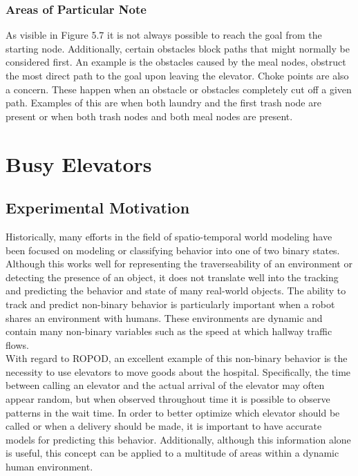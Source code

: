   \subsubsection{ Areas of Particular Note }

  As visible in Figure 5.7 it is not always possible to reach the goal from the
  starting node. Additionally, certain obstacles block paths that might
  normally be considered first. An example is the obstacles caused by
  the meal nodes, obstruct the most direct path to the goal upon leaving
  the elevator. Choke points are also a concern. These happen when an obstacle
  or obstacles completely cut off a given path. Examples of this are when both
  laundry and the first trash node are present or when both trash nodes and both
  meal nodes are present.


  \section{ Busy Elevators }

  \subsection{ Experimental Motivation }

  Historically, many efforts in the field of spatio-temporal world modeling
  have been focused on modeling or classifying behavior into one of two binary
  states. Although this works well for
  representing the traverseability of an environment or detecting the presence of an object,
  it does not translate well into the tracking and predicting the behavior and
  state of many real-world objects. The ability to track and predict
  non-binary behavior is particularly important when a robot shares an
  environment with humans. These environments are dynamic and contain many
  non-binary variables such as the speed at which hallway traffic flows. \\

  With regard to ROPOD, an excellent example of this non-binary
  behavior is the necessity to use elevators to move goods about the hospital.
  Specifically, the time between calling an elevator and the actual arrival of
  the elevator may often appear random, but when observed throughout time
  it is possible to observe patterns in the wait time. In order to better
  optimize which elevator should be called or when a delivery should be made, it
  is important to have accurate models for predicting this behavior.
  Additionally, although this information alone is useful, this concept can
  be applied to a multitude of areas within a dynamic human environment. \\

